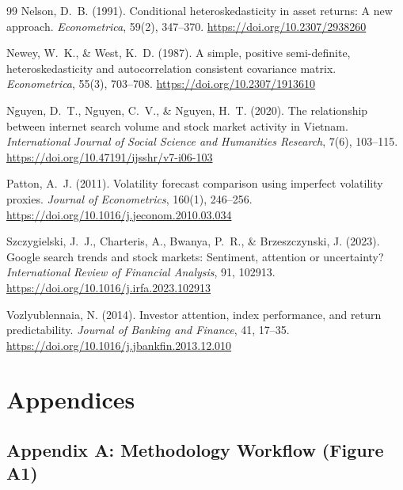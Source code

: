 \documentclass[12pt, a4paper]{article}
\begin{document}
\begin{thebibliography}{99}
Nelson, D.~B. (1991).
\newblock Conditional heteroskedasticity in asset returns: A new approach.
\newblock \textit{Econometrica}, 59(2), 347--370.
\newblock \url{https://doi.org/10.2307/2938260}

Newey, W.~K., \& West, K.~D. (1987).
\newblock A simple, positive semi-definite, heteroskedasticity and
  autocorrelation consistent covariance matrix.
\newblock \textit{Econometrica}, 55(3), 703--708.
\newblock \url{https://doi.org/10.2307/1913610}

Nguyen, D.~T., Nguyen, C.~V., \& Nguyen, H.~T. (2020).
\newblock The relationship between internet search volume and stock market
  activity in Vietnam.
\newblock \textit{International Journal of Social Science and Humanities
  Research}, 7(6), 103--115.
\newblock \url{https://doi.org/10.47191/ijsshr/v7-i06-103}

Patton, A.~J. (2011).
\newblock Volatility forecast comparison using imperfect volatility proxies.
\newblock \textit{Journal of Econometrics}, 160(1), 246--256.
\newblock \url{https://doi.org/10.1016/j.jeconom.2010.03.034}

Szczygielski, J.~J., Charteris, A., Bwanya, P.~R., \& Brzeszczynski, J. (2023).
\newblock Google search trends and stock markets: Sentiment, attention or
  uncertainty?
\newblock \textit{International Review of Financial Analysis}, 91, 102913.
\newblock \url{https://doi.org/10.1016/j.irfa.2023.102913}

Vozlyublennaia, N. (2014).
\newblock Investor attention, index performance, and return predictability.
\newblock \textit{Journal of Banking and Finance}, 41, 17--35.
\newblock \url{https://doi.org/10.1016/j.jbankfin.2013.12.010}

\end{thebibliography}


\appendix
\section*{Appendices}

\subsection*{Appendix A: Methodology Workflow (Figure A1)}
\end{document}
